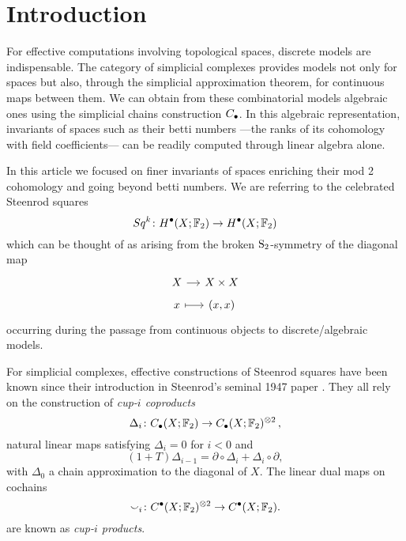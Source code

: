
\section{Introduction}

For effective computations involving topological spaces, discrete models are indispensable.
The category of simplicial complexes provides models not only for spaces but also, through the simplicial approximation theorem, for continuous maps between them.
We can obtain from these combinatorial models algebraic ones using the simplicial chains construction $\chains$.
In this algebraic representation, invariants of spaces such as their betti numbers ---the ranks of its cohomology with field coefficients--- can be readily computed through linear algebra alone.

In this article we focused on finer invariants of spaces enriching their mod 2 cohomology and going beyond betti numbers.
We are referring to the celebrated Steenrod squares
\begin{equation*}
Sq^k \colon H^\bullet(X; \F_2) \to H^\bullet(X; \F_2)
\end{equation*}
which can be thought of as arising from the broken $\S_2$-symmetry of the diagonal map
\begin{equation*}
\begin{tikzcd}[column sep=small, row sep=tiny]
X \arrow[r] & X \times X \\
x \arrow[r, mapsto] & (x,x)
\end{tikzcd}
\end{equation*}
occurring during the passage from continuous objects to discrete/algebraic models.

For simplicial complexes, effective constructions of Steenrod squares have been known since their introduction in Steenrod's seminal 1947 paper \cite{steenrod47}.
They all rely on the construction of \textit{cup-$i$ coproducts}
\begin{equation*}
\Delta_i \colon \chains(X; \F_2)  \to \chains(X; \F_2)^{\otimes 2}\,,
\end{equation*}
natural linear maps satisfying $\Delta_i = 0$ for $i < 0$ and
\begin{equation*}
(1 + T) \Delta_{i-1} = \partial \circ \Delta_i + \Delta_i \circ \partial,
\end{equation*}
with $\Delta_0$ a chain approximation to the diagonal of $X$.
The linear dual maps on cochains
\begin{equation*}
\smallsmile_i \colon \cochains(X; \F_2)^{\otimes 2} \to \cochains(X; \F_2).
\end{equation*}
are known as \textit{cup-$i$ products}.

